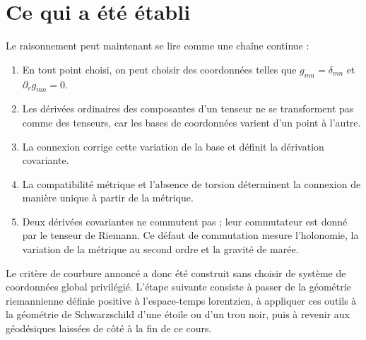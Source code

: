 \section{Ce qui a été établi}

Le raisonnement peut maintenant se lire comme une chaîne continue :
\begin{enumerate}
 \item En tout point choisi, on peut choisir des coordonnées telles que \(g_{mn}=\delta_{mn}\) et \(\partial_rg_{mn}=0\).
 \item Les dérivées ordinaires des composantes d’un tenseur ne se transforment pas comme des tenseurs, car les bases de coordonnées varient d’un point à l’autre.
 \item La connexion corrige cette variation de la base et définit la dérivation covariante.
 \item La compatibilité métrique et l’absence de torsion déterminent la connexion de manière unique à partir de la métrique.
 \item Deux dérivées covariantes ne commutent pas ; leur commutateur est donné par le tenseur de Riemann. Ce défaut de commutation mesure l’holonomie, la variation de la métrique au second ordre et la gravité de marée.
\end{enumerate}

Le critère de courbure annoncé a donc été construit sans choisir de système de coordonnées global privilégié. L’étape suivante consiste à passer de la géométrie riemannienne définie positive à l’espace-temps lorentzien, à appliquer ces outils à la géométrie de Schwarzschild d’une étoile ou d’un trou noir, puis à revenir aux géodésiques laissées de côté à la fin de ce cours.